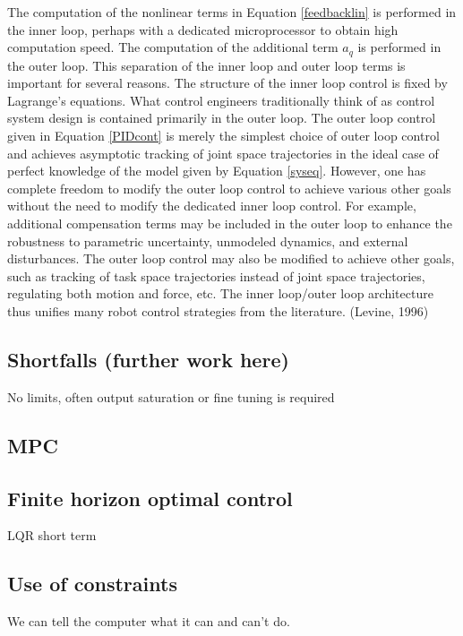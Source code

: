 \documentclass{UoNMCHA}
\numberwithin{equation}{section}
\begin{document}
The computation of the nonlinear terms in Equation \ref{feedbacklin} is performed in the inner loop, perhaps with a dedicated microprocessor to obtain high computation speed. The computation of the additional term $a_q$ is performed in the outer loop. This separation of the inner loop and outer loop terms is important for several reasons. The structure of the inner loop control is fixed by Lagrange's equations. What control engineers traditionally think of as control system design is contained primarily in the outer loop. The outer loop control given in Equation \ref{PIDcont} is merely the simplest choice of outer loop control and achieves asymptotic tracking of joint space trajectories in the ideal case of perfect knowledge of the model given by Equation \ref{syseq}. However, one has complete freedom to modify the outer loop control to achieve various other goals without the need to modify the dedicated inner loop control. For example, additional compensation terms may be included in the outer loop to enhance the robustness to parametric uncertainty, unmodeled dynamics, and external disturbances. The outer loop control may also be modified to achieve other goals, such as tracking of task space trajectories instead of joint space trajectories, regulating both motion and force, etc. The inner loop/outer loop architecture thus unifies many robot control strategies from the literature. (Levine, 1996)

\subsection*{Shortfalls (further work here)}

No limits, often output saturation or fine tuning is required

\subsection{MPC}

\subsection*{Finite horizon optimal control}
LQR short term

\subsection*{Use of constraints}

We can tell the computer what it can and can’t do.  \\
\end{document}
